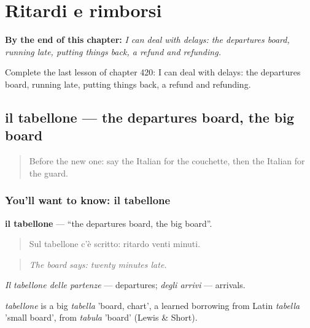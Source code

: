 
\chapter{Ritardi e rimborsi}
\label{ch:it-ritardi-e-rimborsi}

\begin{chapteropening}
\textbf{By the end of this chapter:} \emph{I can deal with delays: the departures board, running late, putting things back, a refund and refunding.}

Complete the last lesson of chapter 420: I can deal with delays: the departures board, running late, putting things back, a refund and refunding.
\end{chapteropening}

\section[il tabellone]{il tabellone — the departures board, the big board}

\label{lesson:IT-C420-tabellone}



\begin{quote}
Before the new one: say the Italian for the couchette, then the Italian for the guard.
\end{quote}

\subsection*{You'll want to know: il tabellone}
\textbf{il tabellone} — \textquotedblleft{}the departures board, the big board\textquotedblright{}.

\begin{quote}
Sul tabellone c'è scritto: ritardo venti minuti.
\end{quote}

\begin{quote}
\emph{The board says: twenty minutes late.}
\end{quote}

\emph{Il tabellone delle partenze} — departures; \emph{degli arrivi} — arrivals.

\begin{cousinweb}
\emph{tabellone} is a big \emph{tabella} 'board, chart', a learned borrowing from Latin \emph{tabella} 'small board', from \emph{tabula} 'board' (Lewis \& Short).
\end{cousinweb}

